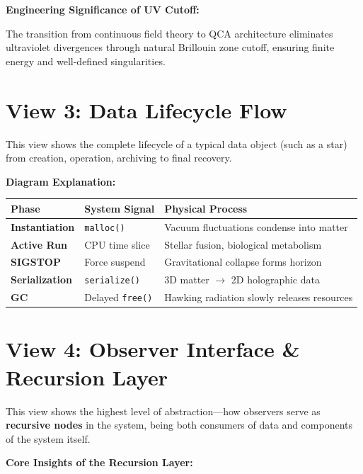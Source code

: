 \textbf{Engineering Significance of UV Cutoff:}

The transition from continuous field theory to QCA architecture eliminates ultraviolet divergences through natural Brillouin zone cutoff, ensuring finite energy and well-defined singularities.

\section{View 3: Data Lifecycle Flow}

This view shows the complete lifecycle of a typical data object (such as a star) from creation, operation, archiving to final recovery.

\textbf{Diagram Explanation:}

\begin{table}[h]
\centering
\begin{tabular}{|l|l|l|}
\hline
\textbf{Phase} & \textbf{System Signal} & \textbf{Physical Process} \\
\hline
\textbf{Instantiation} & \texttt{malloc()} & Vacuum fluctuations condense into matter \\
\hline
\textbf{Active Run} & CPU time slice & Stellar fusion, biological metabolism \\
\hline
\textbf{SIGSTOP} & Force suspend & Gravitational collapse forms horizon \\
\hline
\textbf{Serialization} & \texttt{serialize()} & 3D matter $\to$ 2D holographic data \\
\hline
\textbf{GC} & Delayed \texttt{free()} & Hawking radiation slowly releases resources \\
\hline
\end{tabular}
\end{table}

\section{View 4: Observer Interface \& Recursion Layer}

This view shows the highest level of abstraction---how observers serve as \textbf{recursive nodes} in the system, being both consumers of data and components of the system itself.

\textbf{Core Insights of the Recursion Layer:}

